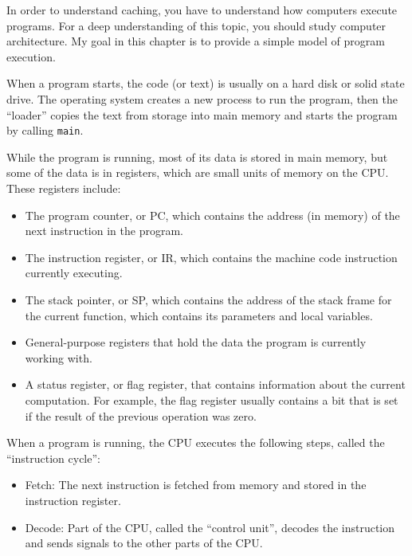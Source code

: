 \documentclass[12pt]{book}
\begin{document}
{In order to understand caching, you have to understand how computers
execute programs.  For a deep understanding of this topic, you should
study computer architecture.  My goal in this chapter is to provide
a simple model of program execution.

When a program starts, the code (or text) is usually on a hard disk
or solid state drive.  The operating system creates a new process to
run the program, then the ``loader''
copies the text from storage into main memory and starts the program by
calling {\tt main}.

While the program is running, most of its data is stored in main
memory, but some of the data is in registers, which are
small units of memory on the CPU.  These registers include:

\begin{itemize}

\item The program counter, or PC, which contains the address (in
  memory) of the next instruction in the program.

\item The instruction register, or IR, which contains the machine code
  instruction currently executing.

\item The stack pointer, or SP, which contains the address of the
  stack frame for the current function, which contains its parameters
  and local variables.

\item General-purpose registers that hold the data the program is
  currently working with.

\item A status register, or flag register, that contains information
  about the current computation.  For example, the flag register
  usually contains a bit that is set if the result of the previous
  operation was zero.

\end{itemize}

When a program is running, the CPU executes the following steps,
called the ``instruction cycle'':

\begin{itemize}

\item Fetch: The next instruction is fetched from memory and stored
in the instruction register.

\item Decode: Part of the CPU, called the ``control unit'', decodes
the instruction and sends signals to the other parts of
the CPU.


\end{itemize}}
\end{document}
